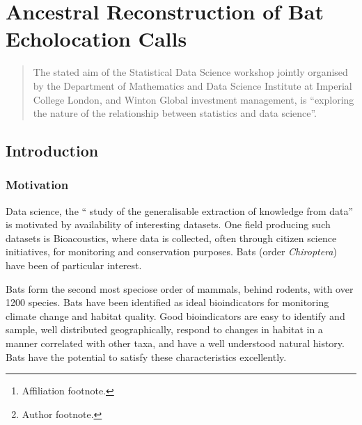 \documentclass[wsdraft]{ws-rv9x6} %
\begin{document}
\chapter[Ancestral Reconstruction of Bat Echolocation Calls]{Ancestral Reconstruction of Bat Echolocation Calls}\label{ra_ch1}

\author[J.P. Meagher et al.]{J.P. Meagher\footnote{Author footnote.}}

\address{Department of Statistics,\\
University of Warwick, \\
J.Meagher@Warwick.ac.uk\footnote{Affiliation footnote.}}

\begin{abstract}
The stated aim of the Statistical Data Science workshop jointly organised by the Department of Mathematics and Data Science Institute at Imperial College London, and Winton Global investment management, is ``exploring the nature of the relationship between statistics and data science''. 
\end{abstract}
\body

\section{Introduction}

\subsection{Motivation}
Data science, the `` study of the generalisable extraction of knowledge from data'' \cite{dhar2013data} is motivated by availability of interesting datasets. One field producing such datasets is Bioacoustics, where data is collected, often through citizen science \cite{kullenberg2016citizen} initiatives, for monitoring and conservation purposes.\cite{allen2006citizen} Bats (order \textit{Chiroptera}) have been of particular interest.\cite{pettorelli2013indicator} 

Bats form the second most speciose order of mammals, behind rodents, with over 1200 species. \cite{simmons2005order} Bats have been identified as ideal bioindicators for monitoring climate change and habitat quality.\cite{jones2009carpe} Good bioindicators are easy to identify and sample, well distributed geographically, respond to changes in habitat in a manner correlated with other taxa, and have a well understood natural history.\cite{moreno2007shortcuts} Bats have the potential to satisfy these characteristics excellently.
\end{document}
